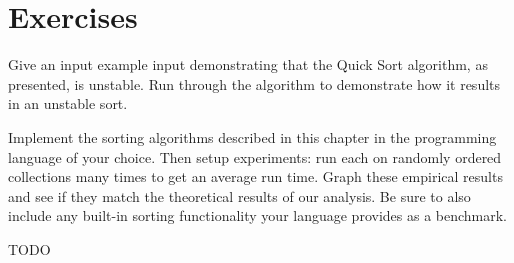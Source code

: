 

\section{Exercises}

\begin{exer}
Give an input example input demonstrating that the Quick Sort algorithm, as 
presented, is unstable.  Run through the algorithm to demonstrate how it 
results in an unstable sort.
\end{exer}


\begin{exer}
Implement the sorting algorithms described in this chapter in the programming
language of your choice.  Then setup experiments: run each on randomly 
ordered collections many times to get an average run time.  Graph these
empirical results and see if they match the theoretical results of
our analysis.  Be sure to also include any built-in sorting functionality
your language provides as a benchmark.
\end{exer}

\begin{exer}
TODO
\end{exer}
